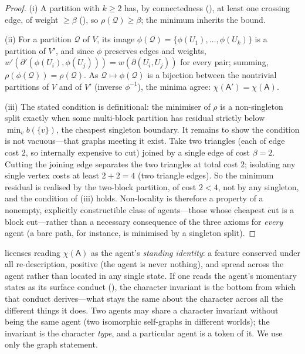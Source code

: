 \documentclass[11pt,twocolumn,a4paper]{article}
\newcommand{\Agent}{\mathsf{A}}
\newcommand{\V}{V}
\newcommand{\wt}{w}
\newcommand{\floorc}{\beta}          %
\newcommand{\cut}{\partial}
\newcommand{\Char}{\chi}             %
\begin{document}
\begin{proof}
(i) A partition with $k\ge2$ has, by connectedness (), at
least one crossing edge, of weight $\ge\floorc$ (), so
$\rho(\mathcal{Q})\ge\floorc$; the minimum inherits the bound.

(ii) For a partition $\mathcal{Q}$ of $\V$, its image
$\phi(\mathcal{Q})=\{\phi(U_1),\dots,\phi(U_k)\}$ is a partition of $\V'$,
and since $\phi$ preserves edges and weights,
$\wt'(\cut'(\phi(U_i),\phi(U_j)))=\wt(\cut(U_i,U_j))$ for every pair;
summing, $\rho(\phi(\mathcal{Q}))=\rho(\mathcal{Q})$. As
$\mathcal{Q}\mapsto\phi(\mathcal{Q})$ is a bijection between the
nontrivial partitions of $\V$ and of $\V'$ (inverse $\phi^{-1}$), the
minima agree: $\Char(\Agent')=\Char(\Agent)$.

(iii) The stated condition is definitional: the minimiser of $\rho$ is a
non-singleton split exactly when some multi-block partition has residual
strictly below $\min_v b(\{v\})$, the cheapest singleton boundary. It
remains to show the condition is not vacuous---that graphs meeting it
exist. Take two triangles (each of edge cost $2$, so internally expensive
to cut) joined by a single edge of cost $\floorc=2$. Cutting the joining
edge separates the two triangles at total cost $2$; isolating any single
vertex costs at least $2+2=4$ (two triangle edges). So the minimum residual
is realised by the two-block partition, of cost $2<4$, not by any
singleton, and the condition of (iii) holds. Non-locality is therefore a
property of a nonempty, explicitly constructible class of agents---those
whose cheapest cut is a block cut---rather than a necessary consequence of
the three axioms for \emph{every} agent (a bare path, for instance, is
minimised by a singleton split).
\end{proof}

\begin{remark}
\label{rem:character}
 licenses reading $\Char(\Agent)$ as the agent's
\emph{standing identity}: a feature conserved under all re-description,
positive (the agent is never nothing), and spread across the agent rather
than located in any single state. If one reads the agent's momentary
states as its surface conduct (), the character
invariant is the bottom from which that conduct derives---what stays the
same about the character across all the different things it does. Two
agents may share a character invariant without being the same agent (two
isomorphic self-graphs in different worlds); the invariant is the
character \emph{type}, and a particular agent is a token of it. We use
only the graph statement.
\end{remark}
\end{document}
